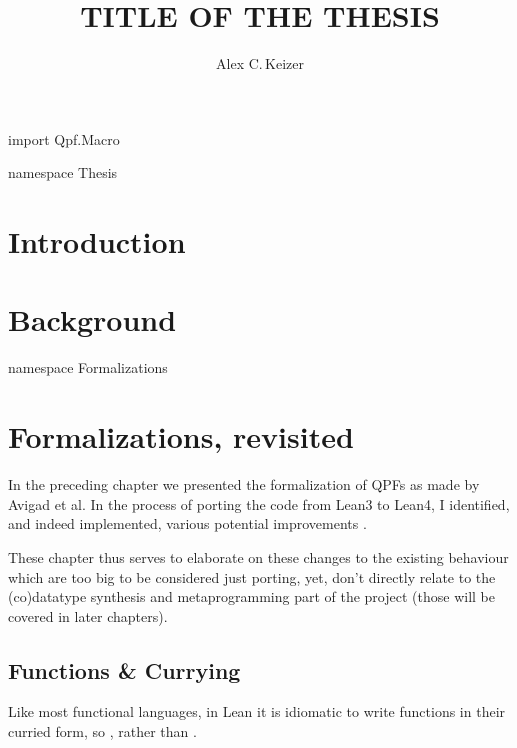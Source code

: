 \documentclass[titlepage]{report}
\newenvironment{leanhidden}{\expandafter\comment}{\expandafter\endcomment}
\begin{document}
%
%
\title{TITLE OF THE THESIS}
\author{Alex C.\,Keizer}
\maketitle


\begin{leanhidden}
    import Qpf.Macro

    namespace Thesis
\end{leanhidden}

%
%
\chapter{Introduction}
\label{ch:intro}






\chapter{Background}
\label{ch:background}











\begin{leanhidden}
    namespace Formalizations
\end{leanhidden}
\chapter{Formalizations, revisited}
In the preceding chapter we presented the formalization of QPFs as made by Avigad et al.
In the process of porting the code from Lean3 to Lean4, 
I identified, and indeed implemented, various potential improvements . 

These chapter thus serves to elaborate on these changes to the existing behaviour which are too big
to be considered just porting, yet, don't directly relate to the (co)datatype synthesis and metaprogramming
part of the project (those will be covered in later chapters).




\section{Functions \& Currying}
Like most functional languages, in Lean it is idiomatic to write functions in their curried form, 
so , rather than .
\end{document}
